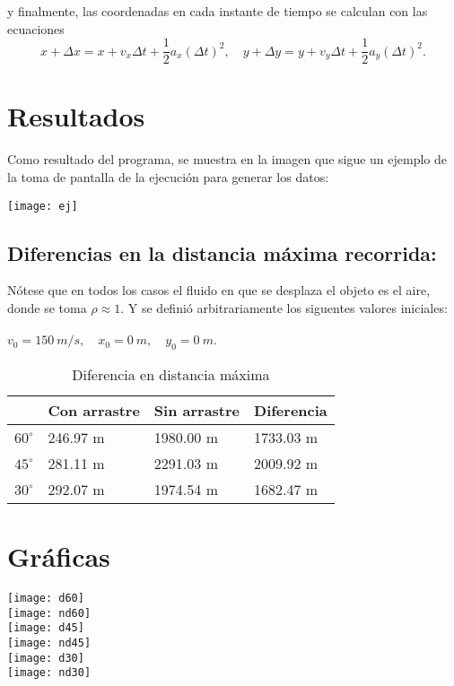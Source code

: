 \documentclass{article}
\begin{document}
y finalmente, las coordenadas en cada instante de tiempo se calculan con las ecuaciones
$$x + \Delta x = x + v_x \Delta t + \frac{1}{2} a_x (\Delta t)^2, \quad y + \Delta y = y + v_y \Delta t + \frac{1}{2} a_y (\Delta t)^2.$$


\section{Resultados}
Como resultado del programa, se muestra en la imagen que sigue un ejemplo de la toma de pantalla de la ejecuci\'on para generar los datos:\\
\begin{center}
\texttt{[image: ej]}\\
\end{center}

\subsection*{Diferencias en la distancia m\'axima recorrida:}
N\'otese que en todos los casos el fluido en que se desplaza el objeto es el aire, donde se toma $\rho \approx 1$. Y se defini\'o arbitrariamente los siguentes valores iniciales:\\ \\
$v_0 = 150 \: m/s, \quad x_0 = 0 \: m, \quad y_0 = 0 \: m.$\\
\begin{table}[h]
\caption {Diferencia en distancia m\'axima} \label{tab:title}
\begin{center}
\begin{tabular}{@{}lll|l@{}}
\toprule
     & Con arrastre & Sin arrastre & Diferencia \\ \midrule
$60 ^{\circ}$ & 246.97 m     & 1980.00 m    & 1733.03 m  \\
$45 ^{\circ}$  & 281.11 m     & 2291.03 m    & 2009.92 m  \\
$30 ^{\circ}$  & 292.07 m     & 1974.54 m    & 1682.47 m  \\ \bottomrule
\end{tabular}
\end{center}
\end{table}

\section{Gr\'aficas}
\texttt{[image: d60]}\\
\texttt{[image: nd60]}\\
\texttt{[image: d45]}\\
\texttt{[image: nd45]}\\
\texttt{[image: d30]}\\
\texttt{[image: nd30]}\\
\end{document}
